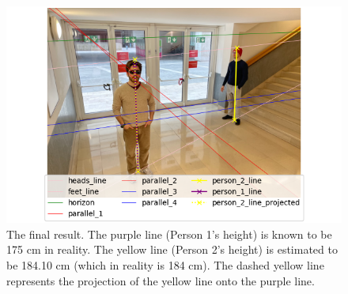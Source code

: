 \begin{figure}
    \centering
    \includegraphics[width=0.55\linewidth]{img/final.png}
    \caption{The final result. The purple line (Person 1's height) is known to be 175 cm in reality. The yellow line (Person 2's height) is estimated to be 184.10 cm (which in reality is 184 cm). The dashed yellow line represents the projection of the yellow line onto the purple line.}
    \label{fig:final}
\end{figure}